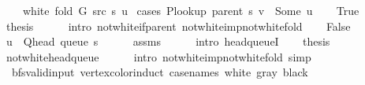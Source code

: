 \begin{isabellebody}
\ \ \ {\isachardoublequoteopen}{\isasymnot}\ white\ {\isacharparenleft}{\kern0pt}fold\ G\ src\ s{\isacharparenright}{\kern0pt}\ u{\isachardoublequoteclose}\isanewline
%
\isadelimproof
%
\endisadelimproof
%
\isatagproof
{}\isamarkupfalse%
\ {\isacharparenleft}{\kern0pt}cases\ {\isachardoublequoteopen}P{\isacharunderscore}{\kern0pt}lookup\ {\isacharparenleft}{\kern0pt}parent\ s{\isacharparenright}{\kern0pt}\ v\ {\isacharequal}{\kern0pt}\ Some\ u{\isachardoublequoteclose}{\isacharparenright}{\kern0pt}\isanewline
\ \ \isamarkupfalse%
\ True\isanewline
\ \ \isamarkupfalse%
\ {\isacharquery}{\kern0pt}thesis\isanewline
\ \ \ \ \isamarkupfalse%
\ {\isacharparenleft}{\kern0pt}intro\ not{\isacharunderscore}{\kern0pt}white{\isacharunderscore}{\kern0pt}if{\isacharunderscore}{\kern0pt}parent\ not{\isacharunderscore}{\kern0pt}white{\isacharunderscore}{\kern0pt}imp{\isacharunderscore}{\kern0pt}not{\isacharunderscore}{\kern0pt}white{\isacharunderscore}{\kern0pt}fold{\isacharparenright}{\kern0pt}\isanewline
{}\isamarkupfalse%
\isanewline
\ \ \isamarkupfalse%
\ False\isanewline
\ \ \isamarkupfalse%
\ {\isachardoublequoteopen}u\ {\isacharequal}{\kern0pt}\ Q{\isacharunderscore}{\kern0pt}head\ {\isacharparenleft}{\kern0pt}queue\ s{\isacharparenright}{\kern0pt}{\isachardoublequoteclose}\isanewline
\ \ \ \ \isamarkupfalse%
\ assms\isanewline
\ \ \ \ \isamarkupfalse%
\ {\isacharparenleft}{\kern0pt}intro\ head{\isacharunderscore}{\kern0pt}queueI{\isacharparenright}{\kern0pt}\isanewline
\ \ \isamarkupfalse%
\ {\isacharquery}{\kern0pt}thesis\isanewline
\ \ \ \ \isamarkupfalse%
\ not{\isacharunderscore}{\kern0pt}white{\isacharunderscore}{\kern0pt}head{\isacharunderscore}{\kern0pt}queue\isanewline
\ \ \ \ \isamarkupfalse%
\ {\isacharparenleft}{\kern0pt}intro\ not{\isacharunderscore}{\kern0pt}white{\isacharunderscore}{\kern0pt}imp{\isacharunderscore}{\kern0pt}not{\isacharunderscore}{\kern0pt}white{\isacharunderscore}{\kern0pt}fold{\isacharparenright}{\kern0pt}\ simp\isanewline
{}\isamarkupfalse%
%
\endisatagproof
{\isafoldproof}%
%
\isadelimproof
\isanewline
%
\endisadelimproof
\isanewline
{}\isamarkupfalse%
\ {\isacharparenleft}{\kern0pt}\ bfs{\isacharunderscore}{\kern0pt}valid{\isacharunderscore}{\kern0pt}input{\isacharparenright}{\kern0pt}\ vertex{\isacharunderscore}{\kern0pt}color{\isacharunderscore}{\kern0pt}induct\ {\isacharbrackleft}{\kern0pt}case{\isacharunderscore}{\kern0pt}names\ white\ gray\ black{\isacharbrackright}{\kern0pt}{\isacharcolon}{\kern0pt}\isanewline

\end{isabellebody}
